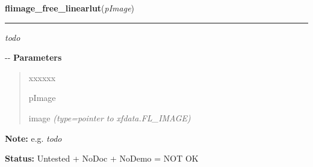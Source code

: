 \hspace{.8\funcindent}\begin{boxedminipage}{\funcwidth}

    \raggedright \textbf{flimage\_free\_linearlut}(\textit{pImage})

    \vspace{-1.5ex}

    \rule{\textwidth}{0.5\fboxrule}
\setlength{\parskip}{2ex}

\emph{todo}

-{}-
\setlength{\parskip}{1ex}
      \textbf{Parameters}
      \vspace{-1ex}

      \begin{quote}
        \begin{Ventry}{xxxxxx}

          \item[pImage]


image
            {\it (type=pointer to xfdata.FL\_IMAGE)}

        \end{Ventry}

      \end{quote}

\textbf{Note:} 
e.g. \emph{todo}


\textbf{Status:} 
Untested + NoDoc + NoDemo = NOT OK


    \end{boxedminipage}

    \label{xformslib:flflimage:flimage_free_rgb}

    \vspace{0.5ex}

